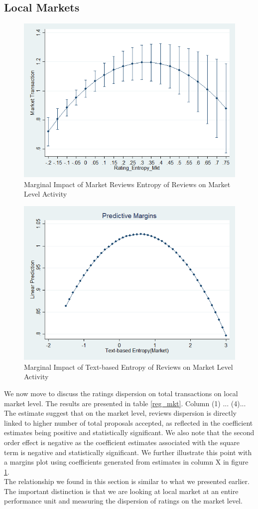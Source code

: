 \documentclass[msom,blindrev]{informs3}
\begin{document}
\subsection{Local Markets}

\begin{figure}
	\centering
	\includegraphics[width=0.7\linewidth]{marginsplot_entmkt.png}
	\caption{Marginal Impact of Market Reviews Entropy of Reviews on Market Level Activity}
	\label{marginsplot_mkt_entmkt}
\end{figure} 
\begin{figure}
	\centering
	\includegraphics[width=0.7\linewidth]{marginsplot_text_ent_mkt_noci.png}
	\caption{Marginal Impact of Text-based Entropy of Reviews on Market Level Activity}
	\label{marginsplot_text_ent_mkt}
\end{figure}  
We now move to discuss the ratings dispersion on total transactions on local market level. The results are presented in table \ref{reg_mkt}. Column (1) ... (4)... The estimate suggest that on the market level, reviews dispersion is directly linked to higher number of total proposals accepted, as reflected in the coefficient estimates being positive and statistically significant. We also note that the second order effect is negative as the coefficient estimates associated with the square term is negative and statistically significant. We further illustrate this point with a margins plot using coefficients generated from estimates in column X in figure \ref{marginsplot_mkt_entmkt}. \\
The relationship we found in this section is similar to what we presented earlier. The important distinction is that we are looking at local market at an entire performance unit and measuring the dispersion of ratings on the market level. 
\end{document}
